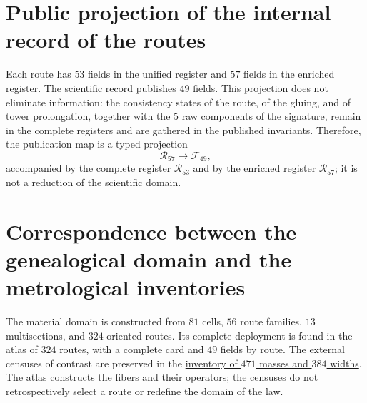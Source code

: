 \section{Public projection of the internal record of the routes}

Each route has \(53\) fields in the unified register and \(57\) fields in the
enriched register. The scientific record publishes \(49\) fields. This
projection does not eliminate information: the consistency states of the route,
of the gluing, and of tower prolongation, together with the \(5\) raw
components of the signature, remain in the complete registers and are gathered in the
published invariants. Therefore, the publication map is a
typed projection
\[
  \mathcal R_{57}\longrightarrow\mathcal F_{49},
\]
accompanied by the complete register \(\mathcal R_{53}\) and by the
enriched register \(\mathcal R_{57}\); it is not a reduction of the scientific domain.

\section{Correspondence between the genealogical domain and the metrological inventories}

The material domain is constructed from \(81\) cells, \(56\) route
families, \(13\) multisections, and \(324\) oriented routes. Its complete deployment
is found in the
\hyperref[chap:atlas-genealogico-exhaustivo-324-rutas]{atlas of \(324\)
routes}, with a complete card and \(49\) fields by route. The external censuses
of contrast are preserved in the
\hyperref[chap:inventario-universal-471-masas-384-anchuras]{inventory of
\(471\) masses and \(384\) widths}. The atlas constructs the fibers and their
operators; the censuses do not retrospectively select a route or
redefine the domain of the law.
